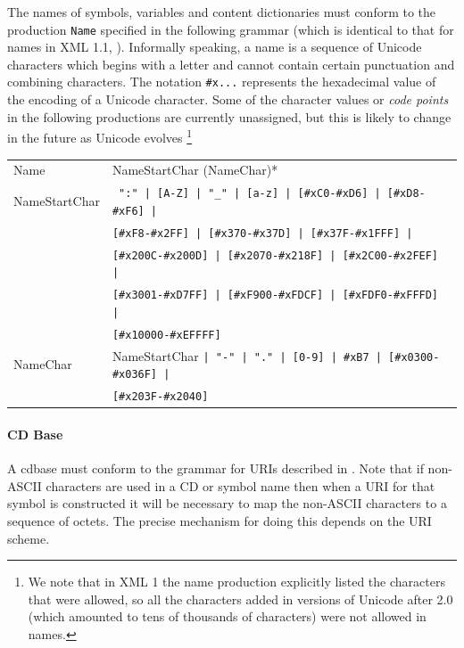 The names of symbols, variables and content dictionaries must conform to the production
\lstinline|Name| specified in the following grammar (which is identical to that for \XML
names in XML 1.1, \cite{xml_04}). Informally speaking, a name is a sequence of Unicode
\cite{UNICODE} characters which begins with a letter and cannot contain certain
punctuation and combining characters.  The notation \lstinline|#x...| represents the
hexadecimal value of the encoding of a Unicode character.  Some of the character values or
\emph{code points} in the following productions are currently unassigned, but this is
likely to change in the future as Unicode evolves \footnote{\label{xml1} We note that in
  XML 1 the name production explicitly listed the characters that were allowed, so all the
  characters added in versions of Unicode after 2.0 (which amounted to tens of thousands
  of characters) were not allowed in names.}


\begin{center}
\begin{tabular}{l@{$\longrightarrow$}p{10cm}}
Name & NameStartChar (NameChar)* \\
NameStartChar & 
\lstinline? ":" | [A-Z] | "_" | [a-z] | [#xC0-#xD6] | [#xD8-#xF6] |?\\
& \lstinline?[#xF8-#x2FF] | [#x370-#x37D] | [#x37F-#x1FFF] |?\\
& \lstinline?[#x200C-#x200D] | [#x2070-#x218F] | [#x2C00-#x2FEF] |?\\
& \lstinline?[#x3001-#xD7FF] | [#xF900-#xFDCF] | [#xFDF0-#xFFFD] |?\\
& \lstinline?[#x10000-#xEFFFF]? \\
NameChar & 
NameStartChar \lstinline?| "-" | "." | [0-9] | #xB7 | [#x0300-#x036F] |?\\
 & \lstinline?[#x203F-#x2040]? 
\end{tabular}
\end{center}

\paragraph{CD Base}

A cdbase must conform to the grammar for URIs described in
\cite{IETF2396}.  Note that if non-ASCII characters are
used in a CD or symbol name then when a URI for that symbol is
constructed it will be necessary to map the non-ASCII characters to a
sequence of octets.  The precise mechanism for doing this depends on
the URI scheme.


